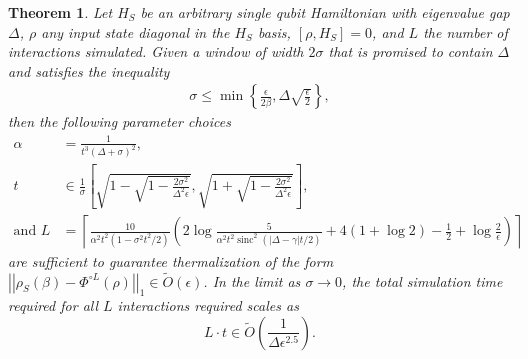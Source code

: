 \documentclass[
 amsmath,amssymb,
 aps,
onecolumn, 
nofootinbib]{revtex4-2}
\newtheorem{theorem}{Theorem}
\newcommand{\norm}[1]{\left|\left| #1 \right|\right|}
\newcommand{\set}[1]{\left\{ #1 \right\}}
\newcommand{\bigotilde}[1]{\widetilde{O} \left( #1 \right)}
\DeclareMathOperator{\sinc}{sinc}
\begin{document}
\begin{theorem} \label{thm:single_qubit}
    Let $H_S$ be an arbitrary single qubit Hamiltonian with eigenvalue gap $\Delta$, $\rho$ any input state diagonal in the $H_S$ basis, $[\rho, H_S] = 0$, and $L$ the number of interactions simulated. Given a window of width $2 \sigma$ that is promised to contain $\Delta$ and satisfies the inequality
    \begin{align}
        \sigma \le \min \set{\frac{\epsilon}{2\beta}, \Delta \sqrt{\frac{\epsilon}{2}}},
    \end{align}
    then the following parameter choices 
    \begin{align}
        \alpha &= \frac{1}{t^3(\Delta + \sigma)^2}, \nonumber \\
        t &\in \frac{1}{\sigma}\left[\sqrt{1 - \sqrt{1 - \frac{2 \sigma^2}{\Delta^2 \epsilon}} }, \sqrt{1 + \sqrt{1 - \frac{2 \sigma^2}{\Delta^2 \epsilon}} } \right], \nonumber\\
        \text{and } L &= \left\lceil\frac{10}{\alpha^2 t^2 (1 - \sigma^2 t^2 / 2)} \left( 2 \log \frac{5}{\alpha^2 t^2 \sinc^2(|\Delta - \gamma|t/2)} + 4( 1 + \log 2) - \frac{1}{2} + \log \frac{2}{\epsilon} \right)\right\rceil
    \end{align}
    are sufficient to guarantee thermalization of the form $\norm{\rho_S(\beta) - \Phi^{\circ L}(\rho)}_1 \in \bigotilde{\epsilon}$. In the limit as $\sigma \to 0$, the total simulation time required for all $L$ interactions required scales as
    \begin{equation}
        L \cdot t \in \widetilde{O} \left( \frac{1}{\Delta \epsilon^{2.5}}\right).
    \end{equation}
\end{theorem}
\end{document}

